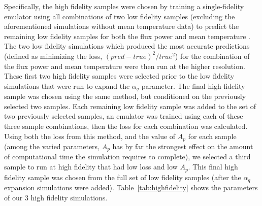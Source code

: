 \documentclass[a4paper,11pt]{article}
\begin{document}
Specifically, the high fidelity samples were chosen by training a single-fidelity emulator using all combinations of two low fidelity samples (excluding the aforementioned simulations without mean temperature data) to predict the remaining low fidelity samples for both the flux power and mean temperature \cite{Ho:2022}.
The two low fidelity simulations which produced the most accurate predictions (defined as minimizing the loss, $(pred - true)^2/true^2$) for the combination of the flux power and mean temperature were then run at the higher resolution.
These first two high fidelity samples were selected prior to the low fidelity simulations that were run to expand the $\alpha_q$ parameter.
The final high fidelity sample was chosen using the same method, but conditioned on the previously selected two samples.
Each remaining low fidelity sample was added to the set of two previously selected samples, an emulator was trained using each of these three sample combinations, then the loss for each combination was calculated.
Using both the loss from this method, and the value of $A_p$ for each sample (among the varied parameters, $A_p$ has by far the strongest effect on the amount of computational time the simulation requires to complete), we selected a third sample to run at high fidelity that had low loss and low $A_p$.
This final high fidelity sample was chosen from the full set of low fidelity samples (after the $\alpha_q$ expansion simulations were added). Table~\ref{tab:highfidelity} shows the parameters of our $3$ high fidelity simulations.
\end{document}

